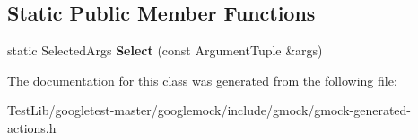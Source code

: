 \subsection*{Static Public Member Functions}
\begin{DoxyCompactItemize}
\item 
\mbox{\label{classtesting_1_1internal_1_1SelectArgs_3_01Result_00_01ArgumentTuple_00_01k1_00_01k2_00_01k3_00_a44b2a3fb6bab261818c61ba2b7f389a_aa200c90be21f74c037c24e5552f5b81e}} 
static Selected\+Args {\bfseries Select} (const Argument\+Tuple \&args)
\end{DoxyCompactItemize}


The documentation for this class was generated from the following file\+:\begin{DoxyCompactItemize}
\item 
Test\+Lib/googletest-\/master/googlemock/include/gmock/gmock-\/generated-\/actions.\+h\end{DoxyCompactItemize}
